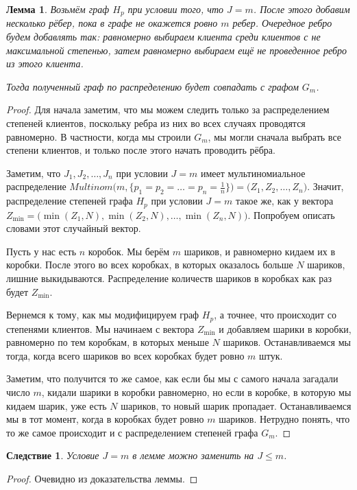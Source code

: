 \documentclass{matmex-diploma-custom}
\newcommand{\leqs}{\leqslant}
\newtheorem{cons}{Следствие}
\newtheorem{lemma}{Лемма}
\theoremstyle{named}
\begin{document}
\begin{lemma} \label{l2}
Возьмём граф $H_p$ при условии того, что $J = m$. 
После этого добавим несколько рёбер, пока в графе не окажется ровно $m$ ребер. 
Очередное ребро будем добавлять так: равномерно выбираем клиента среди клиентов с не максимальной степенью, 
затем равномерно выбираем ещё не проведенное ребро из этого клиента.

Тогда полученный граф по распределению будет совпадать с графом $G_m$.
\end{lemma}
\begin{proof}
Для начала заметим, что мы можем следить только за распределением степеней клиентов, 
поскольку ребра из них во всех случаях проводятся равномерно. В частности, когда мы строили $G_m$, 
мы могли сначала выбрать все степени клиентов, и только после этого начать проводить рёбра.

Заметим, что $J_1, J_2, \dots, J_n$ при условии $J = m$ имеет мультиномиальное распределение 
$Multinom\big(m, \{p_1=p_2= \dots = p_n = \frac{1}{n} \}\big) = \big(Z_1, Z_2, \dots, Z_n\big)$. 
Значит, распределение степеней графа $H_p$ при условии $J = m$ такое же,
как у вектора $Z_{\min} = \big(\min(Z_1, N), \min(Z_2, N), \dots, \min(Z_n, N)\big)$.
Попробуем описать словами этот случайный вектор.

Пусть у нас есть $n$ коробок. Мы берём $m$ шариков, и равномерно кидаем их в коробки. 
После этого во всех коробках, в которых оказалось больше $N$ шариков, лишние выкидываются.
Распределение количеств шариков в коробках как раз будет $Z_{\min}$. 

Вернемся к тому, как мы модифицируем граф $H_p$, а точнее, что происходит со степенями клиентов. 
Мы начинаем с вектора $Z_{\min}$ и добавляем шарики в коробки, 
равномерно по тем коробкам, в которых меньше $N$ шариков. 
Останавливаемся мы тогда, когда всего шариков во всех коробках будет ровно $m$ штук.

Заметим, что получится то же самое, как если бы мы с самого начала загадали число $m$, кидали шарики в коробки равномерно, 
но если в коробке, в которую мы кидаем шарик, уже есть $N$ шариков, то новый шарик пропадает. 
Останавливаемся мы в тот момент, когда в коробках будет ровно $m$ шариков. 
Нетрудно понять, что то же самое происходит и с распределением степеней графа $G_m$.
\end{proof}

\smallskip

\begin{cons} \label{cons_1}
Условие $J = m$ в лемме можно заменить на $J \leqs m$.
\end{cons}
\begin{proof}
Очевидно из доказательства леммы.
\end{proof}
\end{document}
